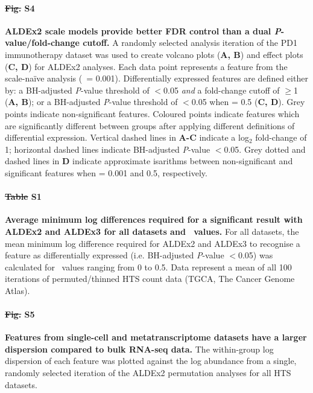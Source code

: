\documentclass[10pt,letterpaper]{article}
\providecommand{\DIFaddtex}[1]{{\protect\color{blue}\uwave{#1}}} %
\providecommand{\DIFdeltex}[1]{{\protect\color{red}\sout{#1}}}                      %
\providecommand{\DIFaddbegin}{} %
\providecommand{\DIFaddend}{} %
\providecommand{\DIFdelbegin}{} %
\providecommand{\DIFdelend}{} %
\providecommand{\DIFadd}[1]{\texorpdfstring{\DIFaddtex{#1}}{#1}} %
\providecommand{\DIFdel}[1]{\texorpdfstring{\DIFdeltex{#1}}{}} %
\newcommand{\DIFscaledelfig}{0.5}
\newlength{\DIFdelgraphicswidth} %
\newlength{\DIFdelgraphicsheight} %
\newcommand{\DIFaddincludegraphics}[2][]{{\color{blue}\fbox{\DIFOincludegraphics[#1]{#2}}}} %
\newcommand{\DIFdelincludegraphics}[2][]{%
\sbox{\DIFdelgraphicsbox}{\DIFOincludegraphics[#1]{#2}}%
\settoboxwidth{\DIFdelgraphicswidth}{\DIFdelgraphicsbox} %
\settoboxtotalheight{\DIFdelgraphicsheight}{\DIFdelgraphicsbox} %
\scalebox{\DIFscaledelfig}{%
\parbox[b]{\DIFdelgraphicswidth}{\usebox{\DIFdelgraphicsbox}\\[-\baselineskip] \rule{\DIFdelgraphicswidth}{0em}}\llap{\resizebox{\DIFdelgraphicswidth}{\DIFdelgraphicsheight}{%
\setlength{\unitlength}{\DIFdelgraphicswidth}%
\begin{picture}(1,1)%
\thicklines\linethickness{2pt} %
{\color[rgb]{1,0,0}\put(0,0){\framebox(1,1){}}}%
{\color[rgb]{1,0,0}\put(0,0){\line( 1,1){1}}}%
{\color[rgb]{1,0,0}\put(0,1){\line(1,-1){1}}}%
\end{picture}%
}\hspace*{3pt}}} %
} %
\DeclareRobustCommand{\DIFaddbegin}{\DIFOaddbegin \let\includegraphics\DIFaddincludegraphics} %
\DeclareRobustCommand{\DIFaddend}{\DIFOaddend \let\includegraphics\DIFOincludegraphics} %
\DeclareRobustCommand{\DIFdelbegin}{\DIFOdelbegin \let\includegraphics\DIFdelincludegraphics} %
\DeclareRobustCommand{\DIFdelend}{\DIFOaddend \let\includegraphics\DIFOincludegraphics} %
\begin{document}
\paragraph*{\DIFdelbegin \DIFdel{Fig. }\DIFdelend S4 \DIFaddbegin \DIFadd{Fig}\DIFaddend }
\label{fig:supFigVolcanoEffectA2}
\textbf{ALDEx2 scale models provide better FDR control than a dual \textit{P}-value/fold-change cutoff.} A randomly selected analysis iteration of the PD1 immunotherapy dataset was used to create volcano plots (\textbf{A, B}) and effect plots (\textbf{C, D}) for ALDEx2 analyses. Each data point represents a feature from the scale-na\"ive analysis (\textgamma~= 0.001). Differentially expressed features are defined either by: a BH-adjusted \textit{P}-value threshold of $<$0.05 \textit{and} a fold-change cutoff of $\geq$1 (\textbf{A, B}); or a BH-adjusted \textit{P}-value threshold of $<$0.05 when \textgamma = 0.5 (\textbf{C, D}). Grey points indicate non-significant features. Coloured points indicate features which are significantly different between groups after applying different definitions of differential expression. Vertical dashed lines in \textbf{A-C} indicate a log$_2$ fold-change of 1; horizontal dashed lines indicate BH-adjusted \textit{P}-value $<$0.05. Grey dotted and dashed lines in \textbf{D} indicate approximate isarithms between non-significant and significant features when \textgamma{} = 0.001 and 0.5, respectively.

\paragraph*{\DIFdelbegin \DIFdel{Table }\DIFdelend S1 \DIFaddbegin \DIFadd{Table}\DIFaddend }
\label{tab:supTabDensity}
\textbf{Average minimum log differences required for a significant result with ALDEx2 and ALDEx3 for all datasets and \textgamma~values.} For all datasets, the mean minimum log difference required for ALDEx2 and ALDEx3 to recognise a feature as differentially expressed (i.e. BH-adjusted \textit{P}-value $<$0.05) was calculated for \textgamma~values ranging from 0 to 0.5. Data represent a mean of all 100 iterations of permuted/thinned HTS count data (TGCA, The Cancer Genome Atlas).

\paragraph*{\DIFdelbegin \DIFdel{Fig. }\DIFdelend S5 \DIFaddbegin \DIFadd{Fig}\DIFaddend }
\label{fig:supFigDispAbund}
\textbf{Features from single-cell and metatranscriptome datasets have a larger dispersion compared to bulk RNA-seq data.} The within-group log dispersion of each feature was plotted against the log abundance from a single, randomly selected iteration of the ALDEx2 permutation analyses for all HTS datasets.
\end{document}
